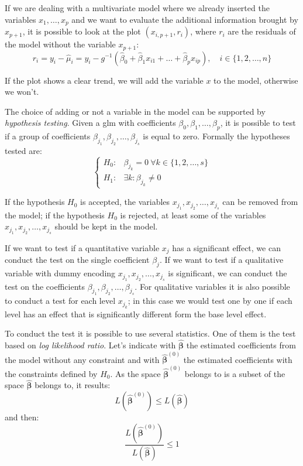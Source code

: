 \documentclass[a4paper, twoside, openright, 12pt]{report}
\theoremstyle{definition}
\theoremstyle{definition}
\theoremstyle{definition}
\theoremstyle{remark}
\begin{document}
If we are dealing with a multivariate model where we already inserted the variables \(x_1, \dots, x_p\) and we want to evaluate the additional information brought by \(x_{p+1}\), it is possible to look at the plot \((x_{i, p+1}, r_i)\), where \(r_i\) are the residuals of the model without the variable \(x_{p+1}\):
\[
r_i = y_i - \hat{\mu}_i = y_i - g^{-1}\left( \hat{\beta}_0 + \hat{\beta}_1 x_{i1} + \dots + \hat{\beta}_p x_{ip} \right), \quad i\in\{1,2,\dots,n\}
\]

If the plot shows a clear trend, we will add the variable \(x\) to the model, otherwise we won't.

The choice of adding or not a variable in the model can be supported by \emph{hypothesis testing}. Given a \ac{glm} with coefficients \(\beta_0, \beta_1, \dots, \beta_p\), it is possible to test if a group of coefficients \(\beta_{j_1}, \beta_{j_2}, \dots, \beta_{j_s}\) is equal to zero. Formally the hypotheses tested are:
\[
\begin{cases}
H_0: & \beta_{j_k} = 0 \ \forall k \in \{1, 2, \dots, s\} \\
H_1: & \exists k: \beta_{j_k} \neq 0
\end{cases}
\]

If the hypothesis \(H_0\) is accepted, the variables \(x_{j_1}, x_{j_2}, \dots, x_{j_s}\) can be removed from the model; if the hypothesis \(H_0\) is rejected, at least some of the variables \(x_{j_1}, x_{j_2}, \dots, x_{j_s}\) should be kept in the model.

If we want to test if a quantitative variable \(x_j\) has a significant effect, we can conduct the test on the single coefficient \(\beta_j\). If we want to test if a qualitative variable with dummy encoding \(x_{j_1}, x_{j_2}, \dots, x_{j_s}\) is significant, we can conduct the test on the coefficients \(\beta_{j_1}, \beta_{j_2}, \dots, \beta_{j_s}\). For qualitative variables it is also possible to conduct a test for each level \(x_{j_k}\); in this case we would test one by one if each level has an effect that is significantly different form the base level effect.

To conduct the test it is possible to use several statistics. One of them is the test based on \emph{log likelihood ratio}. Let's indicate with \(\hat{\boldsymbol{\beta}}\) the estimated coefficients from the model without any constraint and with \(\hat{\boldsymbol{\beta}}^{(0)}\) the estimated coefficients with the constraints defined by \(H_0\). As the space \(\hat{\boldsymbol{\beta}}^{(0)}\) belongs to is a subset of the space \(\hat{\boldsymbol{\beta}}\) belongs to, it results:
\[
L\left(\hat{\boldsymbol{\beta}}^{(0)}\right) \le L\left(\hat{\boldsymbol{\beta}}\right)
\]
and then:
\[
\frac{L\left(\hat{\boldsymbol{\beta}}^{(0)}\right)}{L\left(\hat{\boldsymbol{\beta}}\right)} \le 1
\]
\end{document}
